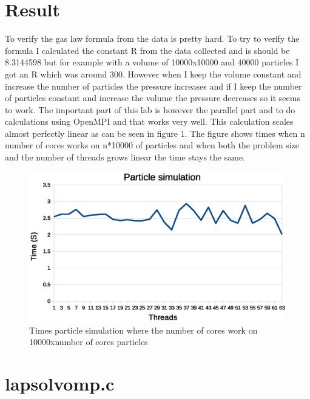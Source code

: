 \documentclass[10pt,twocolumn]{article}
\begin{document}
\section{Result}
To verify the gas law formula from the data is pretty hard. To try to verify the formula I calculated the constant R from the data collected and is should be 8.3144598 but for example with a volume of 10000x10000 and 40000 particles I got an R which was around 300. However when I keep the volume constant and increase the number of particles the pressure increases and if I keep the number of particles constant and increase the volume the pressure decreases so it seems to work. The important part of this lab is however the parallel part and to do calculations using OpenMPI and that works very well. This calculation scales almost perfectly linear as can be seen in figure 1. The figure shows times when n number of cores works on n*10000 of particles and when both the problem size and the number of threads grows linear the time stays the same.
\begin{figure}[H]
\label{img:part}
	\begin{center}
		\includegraphics[scale=0.5]{figurer/times.eps}
	\end{center}
	\caption{Times particle simulation where the number of cores work on 10000xnumber of cores particles}
\end{figure}


\newpage

\onecolumn
\appendix
\section{lapsolvomp.c} \label{app:blur}

\end{document}
